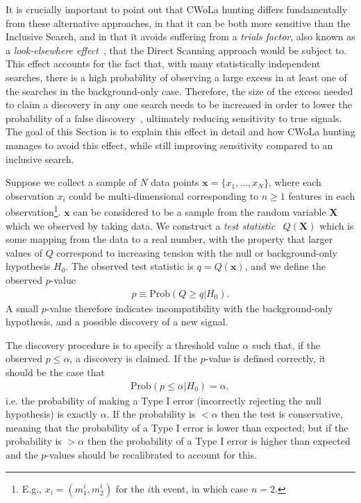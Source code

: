 It is crucially important to point out that CWoLa hunting differs fundamentally from these alternative approaches, in that it can be both more sensitive than the Inclusive Search, and in that it avoids suffering from a \textit{trials factor}, also known as a \textit{look-elsewhere effect}~\cite{miller_1966,mittelhammer_judge_miller_2000,Gross:2010qma,Blance:2019ibf}, that the Direct Scanning approach would be subject to.
This effect accounts for the fact that, with many statistically independent searches, there is a high probability of observing a large excess in at least one of the searches in the background-only case.
Therefore, the size of the excess needed to claim a discovery in any one search needs to be increased in order to lower the probability of a false discovery~\cite{bonferroni1936teoria,dunn1959,dunn1961}, ultimately reducing sensitivity to true signals.
The goal of this Section is to explain this effect in detail and how CWoLa hunting manages to avoid this effect, while still improving sensitivity compared to an inclusive search.

Suppose we collect a sample of $N$ data points $\mathbf{x} =\{x_1,...,x_N\}$, where each observation $x_i$ could be multi-dimensional corresponding to $n\geq 1$ features in each observation\footnote{E.g., $x_i = (m_1^i,m_2^i)$ for the $i$th event, in which case $n=2$.}.
$\mathbf{x}$ can be considered to be a sample from the random variable $\mathbf{X}$ which we observed by taking data.
We construct a \textit{test statistic}~\cite{demortier2007p,Lyons:1900zz,Lyons:2018gtc,cowan_2004,barlow_2002,bohm2010introduction,PDG} $Q(\mathbf{X})$ which is some mapping from the data to a real number, with the property that larger values of $Q$ correspond to increasing tension with the null or background-only hypothesis $H_0$.
The observed test statistic is $q=Q(\mathbf{x})$, and we define the observed $p$-value
\begin{align}
  p \equiv \text{Prob}(Q \geq q | H_0).
\end{align}
A small $p$-value therefore indicates incompatibility with the background-only hypothesis, and a possible discovery of a new signal.

The discovery procedure is to specify a threshold value $\alpha$ such that, if the observed $p\leq\alpha$, a discovery is claimed.
If the $p$-value is defined correctly, it should be the case that
\begin{align}
  \text{Prob}(p \leq \alpha | H_0) = \alpha,
\end{align}
i.e. the probability of making a Type I error (incorrectly rejecting the null hypothesis) is exactly $\alpha$.
If the probability is $<\alpha$ then the test is conservative, meaning that the probability of a Type I error is lower than expected; but if the probability is $>\alpha$ then the probability of a Type I error is higher than expected and the $p$-values should be recalibrated to account for this.

